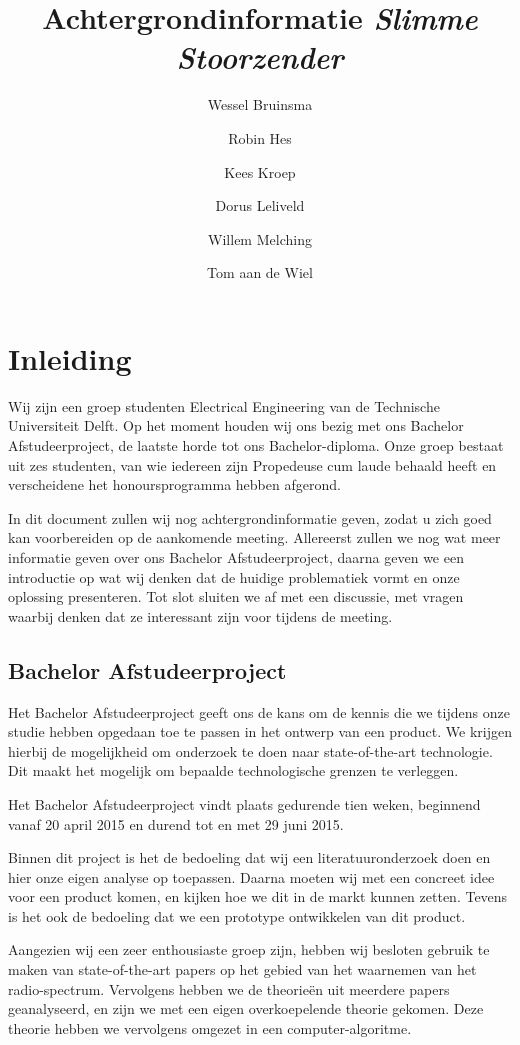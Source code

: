 \documentclass[oneside, a4paper, openany]{memoir}
\title{Achtergrondinformatie \textit{Slimme Stoorzender}}
\author{Wessel Bruinsma \and Robin Hes \and Kees Kroep \and Dorus Leliveld \and Willem Melching \and Tom aan de Wiel}
\begin{document}


\frontmatter
\setcounter{page}{5}
\begin{titlingpage}
  \pagestyle{empty}
  \titleGM
\end{titlingpage}

\tableofcontents

\clearpage
\mainmatter

\chapter{Inleiding}
Wij zijn een groep studenten Electrical Engineering van de Technische Universiteit Delft. Op het moment houden wij ons bezig met ons Bachelor Afstudeerproject, de laatste horde tot ons Bachelor-diploma. Onze groep bestaat uit zes studenten, van wie iedereen zijn Propedeuse cum laude behaald heeft en verscheidene het honoursprogramma hebben afgerond.

In dit document zullen wij nog achtergrondinformatie geven, zodat u zich goed kan voorbereiden op de aankomende meeting. Allereerst zullen we nog wat meer informatie geven over ons Bachelor Afstudeerproject, daarna geven we een introductie op wat wij denken dat de huidige problematiek vormt en onze oplossing presenteren. Tot slot sluiten we af met een discussie, met vragen waarbij denken dat ze interessant zijn voor tijdens de meeting.


\section{Bachelor Afstudeerproject}
Het Bachelor Afstudeerproject geeft ons de kans om de kennis die we tijdens onze studie hebben opgedaan toe te passen in het ontwerp van een product. We krijgen hierbij de mogelijkheid om onderzoek te doen naar state-of-the-art technologie. Dit maakt het mogelijk om bepaalde technologische grenzen te verleggen.

Het Bachelor Afstudeerproject vindt plaats gedurende tien weken, beginnend vanaf 20 april 2015 en durend tot en met 29 juni 2015.

Binnen dit project is het de bedoeling dat wij een literatuuronderzoek doen en hier onze eigen analyse op toepassen. Daarna moeten wij met een concreet idee voor een product komen, en kijken hoe we dit in de markt kunnen zetten. Tevens is het ook de bedoeling dat we een prototype ontwikkelen van dit product.

Aangezien wij een zeer enthousiaste groep zijn, hebben wij besloten gebruik te maken van state-of-the-art papers op het gebied van het waarnemen van het radio-spectrum. Vervolgens hebben we de theorieën uit meerdere papers geanalyseerd, en zijn we met een eigen overkoepelende theorie gekomen. Deze theorie hebben we vervolgens omgezet in een computer-algoritme.
\end{document}
